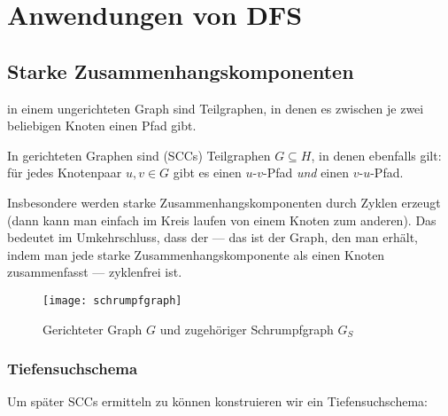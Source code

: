 \chapter{Anwendungen von DFS}

\section{Starke Zusammenhangskomponenten}

 in einem ungerichteten Graph sind Teilgraphen, in denen es zwischen je zwei beliebigen Knoten einen Pfad gibt.

In gerichteten Graphen sind  (SCCs) Teilgraphen \( G \subseteq H \), in denen ebenfalls gilt: für jedes Knotenpaar \( u,v \in G \) gibt es einen \( u \)-\( v \)-Pfad \emph{und} einen \( v \)-\( u \)-Pfad.

Insbesondere werden starke Zusammenhangskomponenten durch Zyklen erzeugt (dann kann man einfach im Kreis laufen von einem Knoten zum anderen). Das bedeutet im Umkehrschluss, dass der  --- das ist der Graph, den man erhält, indem man jede starke Zusammenhangskomponente als einen Knoten zusammenfasst --- zyklenfrei ist.

\begin{figure}[H]
  \texttt{[image: schrumpfgraph]}
  \caption{Gerichteter Graph \( G \) und zugehöriger Schrumpfgraph \( G_S \)}
\end{figure}

\subsection{Tiefensuchschema}

Um später SCCs ermitteln zu können konstruieren wir ein Tiefensuchschema:

